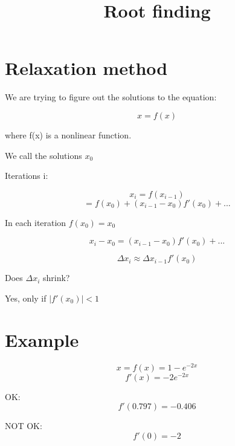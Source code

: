 \documentclass{article}
\title{Root finding}
\begin{document}
  \maketitle
  \newpage


\section*{Relaxation method}

We are trying to figure out the solutions to the equation:

$$x=f(x)$$

where f(x) is a nonlinear function.

We call the solutions $x_0$

Iterations i:

$$x_i = f(x_{i-1}) $$
$$= f(x_0) + (x_{i-1}-x_0)f'(x_0) + ...$$

In each iteration $f(x_0) = x_0$

$$x_i - x_0 = (x_{i-1}-x_0)f'(x_0) + ... $$

$$\Delta x_i \approx \Delta x_{i-1} f'(x_0)$$

Does $\Delta x_i $ shrink?

Yes, only if $|f'(x_0)| < 1$

\section*{Example}

$$x = f(x) = 1 - e^{-2x}$$
$$f'(x) = -2e^{-2x}$$

OK:
$$f'(0.797) = -0.406$$

NOT OK:
$$f'(0) = -2$$
\end{document}
